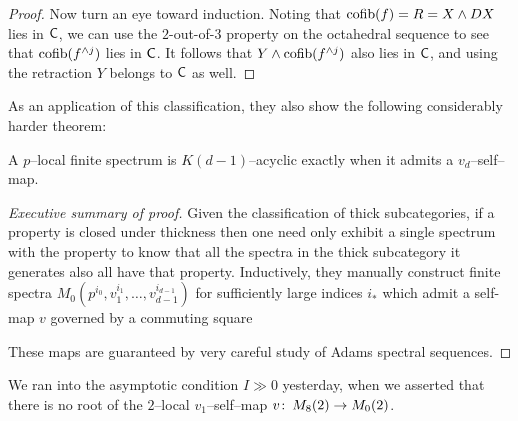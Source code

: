 \begin{proof}
Now turn an eye toward induction.  Noting that $\operatorname{cofib}(f) = R = X \wedge DX$ lies in $\mathsf{C}$, we can use the $2$-out-of-$3$ property on the octahedral sequence to see that $\operatorname{cofib}(f^{\wedge j})$ lies in $\mathsf{C}$.  It follows that $Y \wedge \operatorname{cofib}(f^{\wedge j})$ also lies in $\mathsf{C}$, and using the retraction $Y$ belongs to $\mathsf{C}$ as well.
\end{proof}

As an application of this classification, they also show the following considerably harder theorem:

\begin{theorem}
A $p$--local finite spectrum is $K(d-1)$--acyclic exactly when it admits a $v_d$--self--map.
\end{theorem}
\begin{proof}[Executive summary of proof]
Given the classification of thick subcategories, if a property is closed under thickness then one need only exhibit a single spectrum with the property to know that all the spectra in the thick subcategory it generates also all have that property.  Inductively, they manually construct finite spectra $M_0(p^{i_0}, v_1^{i_1}, \ldots, v_{d-1}^{i_{d-1}})$ for sufficiently large indices $i_*$ which admit a self-map $v$ governed by a commuting square
\begin{center}
\end{center} 
These maps are guaranteed by very careful study of Adams spectral sequences.
\end{proof}

\begin{remark}
We ran into the asymptotic condition $I \gg 0$ yesterday, when we asserted that there is no root of the $2$--local $v_1$--self--map $v\colon\thinspace M_8(2) \to M_0(2)$.
\end{remark}

